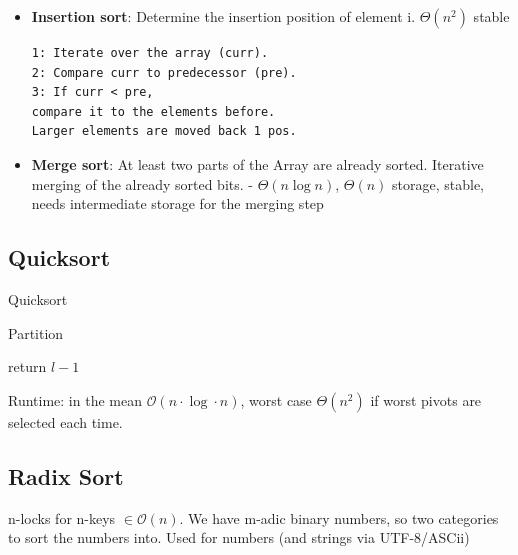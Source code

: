 \documentclass[10pt,landscape,a4paper, table]{extarticle}
\begin{document}
\begin{multicols*}{3}
\begin{itemize}
    \item \textbf{Insertion sort}: Determine the insertion position of element i. $\Theta(n^2)$ stable
    
\begin{verbatim}
1: Iterate over the array (curr).
2: Compare curr to predecessor (pre).
3: If curr < pre,
compare it to the elements before.
Larger elements are moved back 1 pos.
\end{verbatim}
    \item \textbf{Merge sort}: At least two parts of the Array are already sorted. Iterative merging of the already sorted bits. - $\Theta(n \log n)$,  $\Theta(n)$ storage, stable,  needs intermediate storage for the merging step
\end{itemize}
\subsection{Quicksort}
{\scriptsize
\begin{algorithm}[H]
    \caption{Quicksort}
    \label{FWAlgorithm}
    \SetAlgoLined
\end{algorithm}}

{\scriptsize
\begin{algorithm}[H]
    \caption{Partition}
    \label{FWAlgorithm}
    \SetAlgoLined
    
    return $l-1$
\end{algorithm}}

Runtime: in the mean $\mathcal{O}(n\cdot \log \cdot n)$, worst case $\Theta(n^2)$ if worst pivots are selected each time.

\subsection{Radix Sort}
n-locks for n-keys $\in \mathcal{O}(n)$. We have m-adic binary numbers, so two categories to sort the numbers into. Used for numbers (and strings via UTF-8/ASCii)

\end{multicols*}
\end{document}
